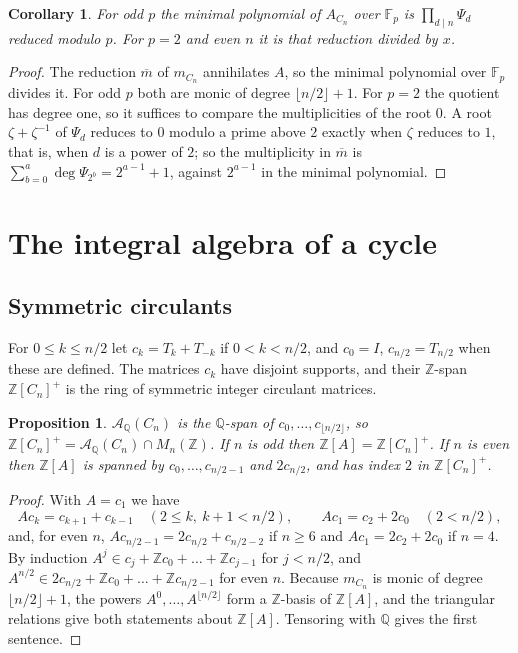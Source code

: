 \documentclass[11pt]{amsart}
\newtheorem{proposition}[theorem]{Proposition}
\newtheorem{corollary}[theorem]{Corollary}
\theoremstyle{definition}
\theoremstyle{remark}
\numberwithin{equation}{section}
\newcommand{\Q}{\mathbb{Q}}
\newcommand{\Z}{\mathbb{Z}}
\newcommand{\F}{\mathbb{F}}
\newcommand{\cA}{\mathcal{A}}
\begin{document}
\begin{corollary}\label{cor:reduction}
For odd $p$ the minimal polynomial of $A_{C_n}$ over $\F_p$ is $\prod_{d\mid n}\Psi_d$ reduced modulo $p$. For $p=2$ and even $n$ it is that reduction divided by $x$.
\end{corollary}

\begin{proof}
The reduction $\overline m$ of $m_{C_n}$ annihilates $A$, so the minimal polynomial over $\F_p$ divides it. For odd $p$ both are monic of degree $\lfloor n/2\rfloor+1$. For $p=2$ the quotient has degree one, so it suffices to compare the multiplicities of the root $0$. A root $\zeta+\zeta^{-1}$ of $\Psi_d$ reduces to $0$ modulo a prime above $2$ exactly when $\zeta$ reduces to $1$, that is, when $d$ is a power of $2$; so the multiplicity in $\overline m$ is $\sum_{b=0}^{a}\deg\Psi_{2^b}=2^{a-1}+1$, against $2^{a-1}$ in the minimal polynomial.
\end{proof}

\section{The integral algebra of a cycle}\label{sec:integral}

\subsection{Symmetric circulants} For $0\le k\le n/2$ let $c_k=T_k+T_{-k}$ if $0<k<n/2$, and $c_0=I$, $c_{n/2}=T_{n/2}$ when these are defined. The matrices $c_k$ have disjoint supports, and their $\Z$-span $\Z[C_n]^+$ is the ring of symmetric integer circulant matrices.

\begin{proposition}\label{prop:sym}
$\cA_\Q(C_n)$ is the $\Q$-span of $c_0,\dots,c_{\lfloor n/2\rfloor}$, so $\Z[C_n]^+=\cA_\Q(C_n)\cap M_n(\Z)$. If $n$ is odd then $\Z[A]=\Z[C_n]^+$. If $n$ is even then $\Z[A]$ is spanned by $c_0,\dots,c_{n/2-1}$ and $2c_{n/2}$, and has index $2$ in $\Z[C_n]^+$.
\end{proposition}

\begin{proof}
With $A=c_1$ we have
\[
Ac_k=c_{k+1}+c_{k-1}\quad(2\le k,\ k+1<n/2),\qquad Ac_1=c_2+2c_0\quad(2<n/2),
\]
and, for even $n$, $Ac_{n/2-1}=2c_{n/2}+c_{n/2-2}$ if $n\ge6$ and $Ac_1=2c_2+2c_0$ if $n=4$. By induction $A^j\in c_j+\Z c_0+\dots+\Z c_{j-1}$ for $j<n/2$, and $A^{n/2}\in 2c_{n/2}+\Z c_0+\dots+\Z c_{n/2-1}$ for even $n$. Because $m_{C_n}$ is monic of degree $\lfloor n/2\rfloor+1$, the powers $A^0,\dots,A^{\lfloor n/2\rfloor}$ form a $\Z$-basis of $\Z[A]$, and the triangular relations give both statements about $\Z[A]$. Tensoring with $\Q$ gives the first sentence.
\end{proof}
\end{document}
